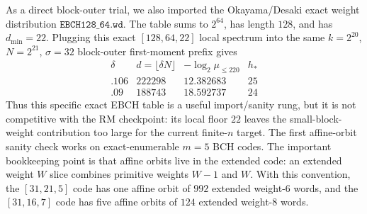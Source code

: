 As a direct block-outer trial, we also imported the Okayama/Desaki exact weight distribution
\(\texttt{EBCH128\_64.wd}\).  The table sums to \(2^{64}\), has length \(128\), and has \(d_{\min}=22\).  Plugging this
exact \([128,64,22]\) local spectrum into the same \(k=2^{20}\), \(N=2^{21}\), \(\sigma=32\) block-outer first-moment
prefix gives
\[
\begin{array}{c|c|c|c}
\delta & d=\lfloor \delta N\rfloor & -\log_2 \mu_{\le220} & h_*\\
\hline
.106 & 222298 & 12.382683 & 25\\
.09 & 188743 & 18.592737 & 24
\end{array}
\]
Thus this specific exact EBCH table is a useful import/sanity rung, but it is not competitive with the RM checkpoint:
its local floor \(22\) leaves the small-block-weight contribution too large for the current finite-\(n\) target.
The first affine-orbit sanity check works on exact-enumerable \(m=5\) BCH codes.  The important bookkeeping point is
that affine orbits live in the extended code: an extended weight \(W\) slice combines primitive weights \(W-1\) and
\(W\).  With this convention, the \([31,21,5]\) code has one affine orbit of \(992\) extended weight-\(6\) words, and
the \([31,16,7]\) code has five affine orbits of \(124\) extended weight-\(8\) words.

